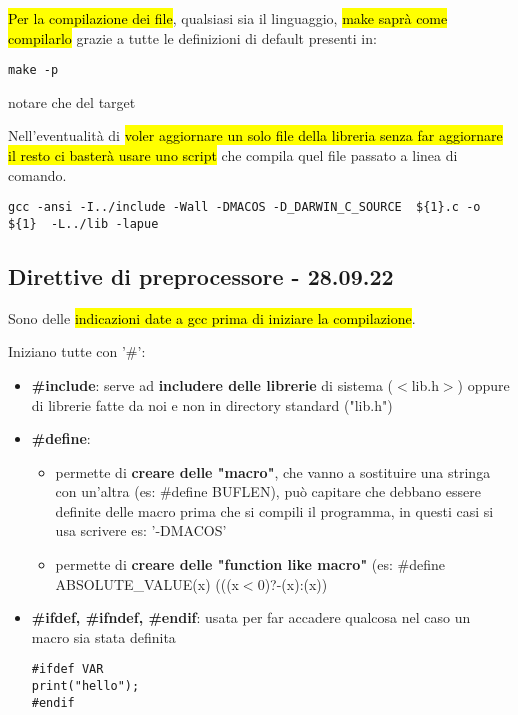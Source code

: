 \hl{Per la compilazione dei file}, qualsiasi sia il linguaggio, \hl{make saprà come compilarlo} grazie a tutte le definizioni di default presenti in:

\begin{lstlisting}
make -p
\end{lstlisting}

notare che  del target

Nell'eventualità di \hl{voler aggiornare un solo file della libreria senza far aggiornare il resto ci basterà usare uno script} che compila quel file passato a linea di comando.

\begin{lstlisting}
gcc -ansi -I../include -Wall -DMACOS -D_DARWIN_C_SOURCE  ${1}.c -o ${1}  -L../lib -lapue
\end{lstlisting}



\subsection{Direttive di preprocessore - 28.09.22}
Sono delle \hl{indicazioni date a gcc prima di iniziare la compilazione}.

Iniziano tutte con '\#':
\begin{itemize}
	\item \textbf{\#include}: serve ad \textbf{includere delle librerie} di sistema ($<$lib.h$>$) oppure di librerie fatte da noi e non in directory standard ("lib.h")
	\item \textbf{\#define}:
		\begin{itemize}
			\item permette di \textbf{creare delle "macro"}, che vanno a sostituire una stringa con un'altra (es: \#define BUFLEN), può capitare che debbano essere definite delle macro prima che si compili il programma, in questi casi si usa scrivere es: '-DMACOS'
			\item permette di \textbf{creare delle "function like macro"} (es: \#define ABSOLUTE\_VALUE(x) (((x$<$0)?-(x):(x))  
		\end{itemize}
		
	\item \textbf{\#ifdef, \#ifndef, \#endif}: usata per far accadere qualcosa nel caso un macro sia stata definita
\begin{lstlisting}
#ifdef VAR
print("hello");
#endif
\end{lstlisting}

\end{itemize} 

